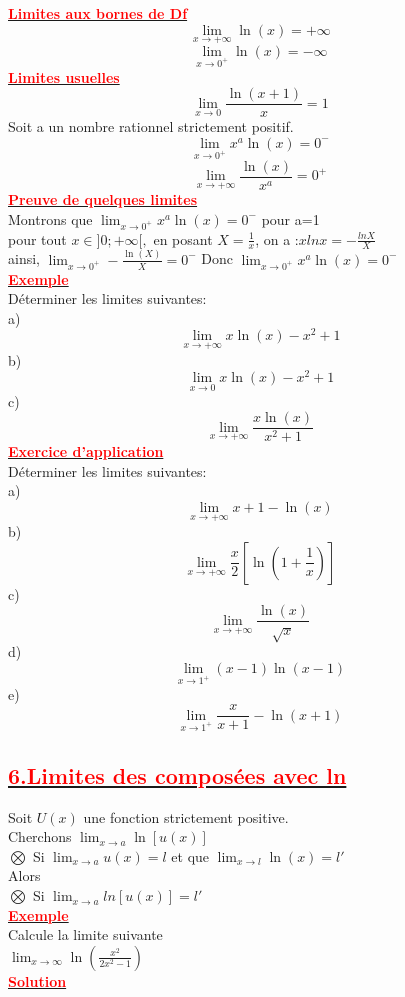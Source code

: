\documentclass[12pt]{article}
\begin{document}
\underline{\textbf{\textcolor{red}{Limites aux bornes de Df }}}\\
\[\lim_{{x \to +\infty}} \ln(x) = +\infty\]
\[\lim_{{x \to 0^+}} \ln(x) = -\infty\]
\underline{\textbf{\textcolor{red}{Limites usuelles}}}\\
\[\lim_{{x \to 0}} \frac{\ln(x+1)}{x}=1\]
Soit a un nombre rationnel strictement positif.
\[\lim_{{x \to 0^+}} x^{a}\ln(x) = 0^{-} \]
\[\lim_{{x \to +\infty}} \frac{\ln(x)}{x^{a}}=0^{+}\]
\underline{\textbf{\textcolor{red}{Preuve de quelques limites}}}\\
Montrons que $\lim_{{x \to 0^+}} x^{a}\ln(x) = 0^{-}$ pour a=1\\
pour tout $x\in]0;+\infty[,$ en posant $X=\frac{1}{x}$, on a :$xlnx=-\frac{lnX}{X}$\\
ainsi, $\lim_{{x \to 0^{+}}} -\frac{\ln(X)}{X}=0^{-}$
Donc $\lim_{{x \to 0^+}} x^{a}\ln(x) = 0^{-}$\\
\underline{\textbf{\textcolor{red}{Exemple}}}\\
Déterminer les limites suivantes:\\
a)\[\lim_{{x \to +\infty}} x\ln(x)-x^{2}+1\]
b)\[\lim_{{x \to 0}} x\ln(x)-x^{2}+1\]
c)\[\lim_{{x \to +\infty}} \frac{x\ln(x)}{x^{2}+1}\]
\underline{\textbf{\textcolor{red}{Exercice d'application}}}\\
Déterminer les limites suivantes:\\
a)\[\lim_{{x \to +\infty}} x+1-\ln(x)\]
b)\[\lim_{{x \to +\infty}} \frac{x}{2}[\ln(1+\frac{1}{x})]\]
c)\[\lim_{{x \to +\infty}} \frac{\ln(x)}{\sqrt{x}}\]
d)\[\lim_{{x \to 1^{+}}} (x-1)\ln(x-1)\]
e)\[\lim_{{x \to 1^{+}}} \frac{x}{x+1}-\ln(x+1)\]
\subsection*{\underline{\textbf{\textcolor{red}{6.Limites des composées avec ln}}}}
Soit $U(x)$ une fonction strictement positive.\\
Cherchons $\lim_{{x \to a}} \ln[u(x)]$\\
$\bigotimes$ Si $\lim_{{x \to a}} u(x)=l$ et que $\lim_{{x \to l}} \ln(x)=l'$\\
Alors \\
$\bigotimes$ Si $\lim_{{x \to a}} ln[u(x)]=l'$\\
\underline{\textbf{\textcolor{red}{Exemple}}}\\
Calcule la limite suivante\\
$\lim_{{x \to \infty}} \ln(\frac{x^{2}}{2x^{2}-1})$\\
\underline{\textbf{\textcolor{red}{Solution}}}\\
\end{document}

